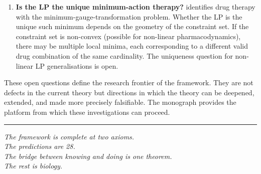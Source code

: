 \begin{enumerate}[leftmargin=2em]
  \item \textbf{Is the LP the unique minimum-action therapy?}
     identifies drug therapy with the
    minimum-gauge-transformation problem.  Whether the LP is the unique
    such minimum depends on the geometry of the constraint set.  If the
    constraint set is non-convex (possible for non-linear pharmacodynamics),
    there may be multiple local minima, each corresponding to a different valid
    drug combination of the same cardinality.  The uniqueness question for
    non-linear LP generalisations is open.
\end{enumerate}

These open questions define the research frontier of the framework.  They are
not defects in the current theory but directions in which the theory can be
deepened, extended, and made more precisely falsifiable.  The monograph provides
the platform from which these investigations can proceed.

\bigskip
\noindent\rule{\textwidth}{0.4pt}
\bigskip

\begin{center}
  \itshape
  The framework is complete at two axioms.\\
  The predictions are 28.\\
  The bridge between knowing and doing is one theorem.\\
  The rest is biology.
\end{center}
